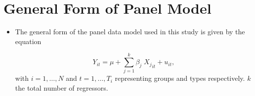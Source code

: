 \documentclass[landscape,letterpaper,9pt]{article}
\newcommand\cbox[1]{\colorbox{darkyellow}{#1}}
\begin{document}
\newpage
\section{General Form of Panel Model}

\begin{itemize}
\item The \cbox{general form} of the panel data model used in this study is given by the equation

%
%

\begin{equation}\label{eq:modd}
Y_{it} = \mu +    
\sum_{j= 1}^{k} \beta_{j} \; {X_{j}}_{it} + u_{\scriptscriptstyle{it}},
\end{equation}
with \(i=1, \ldots, N\) and \( t= 1, \ldots, T_i\) representing
groups and types respectively.
\(k\) the total number of regressors.


\end{itemize}
\end{document}
